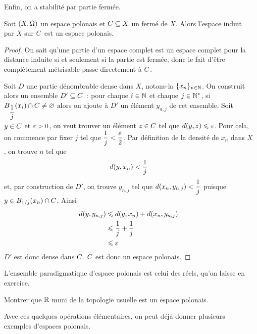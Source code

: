 \noindent
Enfin, on a stabilité par partie fermée.

\begin{proposition}\label{desc.ferme.polonais}
  Soit $(X,\topo)$ un espace polonais et $\varCl\subseteq X$ un fermé de $X$.
  Alors l'espace induit par $X$ sur $\varCl$ est un espace polonais.
\end{proposition}

\begin{proof}
  On sait qu'une partie d'un espace complet est un espace complet pour la
  distance induite si et seulement si la partie est fermée, donc le fait d'être
  complètement métrisable passe directement à $\varCl$.
  
  Soit $D$ une partie dénombrable dense dans $X$, notons-la
  $\{x_n\}_{n\in\bN}$. On construit alors un ensemble $D'\subseteq \varCl$~: pour
  chaque $i\in \bN$ et chaque $j\in \bN^*$, si
  $\boule{x_i}{\dfrac{1}{j}}\cap \varCl\neq\vide$ alors on ajoute à $D'$
  un élément $y_{n,j}$ de cet ensemble. Soit $y\in\varCl$ et $\vareps > 0$, on
  veut trouver un élément $z\in \varCl$ tel que $\vardis(y,z) \leq \vareps$.
  Pour cela, on commence par fixer $j$ tel que
  $\dfrac{1}{j} < \dfrac{\vareps}{2}$. Par définition de la densité de $x_n$
  dans $X$, on trouve $n$ tel que
  \[\vardis(y,x_n) < \frac{1}{j}\]
  et, par construction de $D'$, on trouve $y_{n,j}$ tel que
  $\vardis(x_n,y_{n,j})<\dfrac{1}{j}$ puisque $y \in\boule{x_n}{1/j}\cap\varCl$.
  Ainsi
  \begin{align*}
    \vardis(y,y_{n,j}) &\leq \vardis(y,x_n) + \vardis(x_n,y_{n,j})\\
    &\leq \frac{1}{j} + \frac{1}{j}\\
    &\leq \vareps
  \end{align*}
  $D'$ est donc dense dans $\varCl$. $\varCl$ est donc un espace polonais.
\end{proof}

\noindent
L'ensemble paradigmatique d'espace polonais est celui des réels, qu'on laisse
en exercice.

\begin{exercise}
  Montrer que $\bR$ muni de la topologie usuelle est un espace polonais.
\end{exercise}

Avec ces quelques opérations élémentaires, on peut déjà donner plusieurs
exemples d'espaces polonais.

